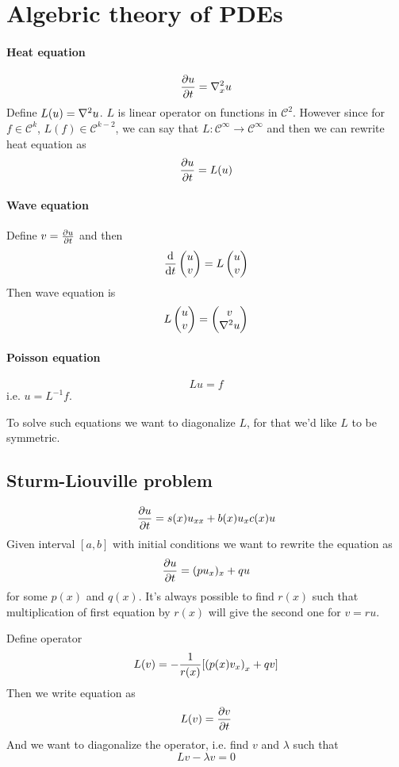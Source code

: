 \section{Algebric theory of PDEs}
\paragraph{Heat equation}
$$\pdv{u}{t} = \laplacian_x u$$
Define $L(u) = \laplacian u$. $L$ is linear operator on functions in $\mathcal{C}^2$. However since for $f\in \mathcal{C}^k$, $L(f) \in \mathcal{C}^{k-2}$, we can say that $L: \mathcal{C}^\infty \to \mathcal{C}^\infty$ and then we can rewrite heat equation as
$$\pdv{u}{t}  =L(u)$$

\paragraph{Wave equation}
Define $v=\pdv{u}{t}$ and then
$$\dv{t} \begin{pmatrix}u\\v\end{pmatrix} = L \begin{pmatrix}u\\v\end{pmatrix}$$
Then wave equation is
$$ L \begin{pmatrix}u\\v\end{pmatrix}=  \begin{pmatrix}v\\\laplacian{u}\end{pmatrix} $$

\paragraph{Poisson equation}
$$Lu = f$$
i.e.
$u=L^{-1}f$.

To solve such equations we want to diagonalize $L$, for that we'd like $L$ to be symmetric.
\subsection{Sturm-Liouville problem }
$$\pdv{u}{t} = s(x) u_{xx} + b(x) u_x c(x) u$$
Given interval $[a,b]$ with initial conditions we want to rewrite the equation as
$$\pdv{u}{t} = (pu_x)_x + qu$$
for some $p(x)$ and $q(x)$. It's always possible to find  $r(x)$ such that multiplication of first equation by $r(x)$ will give the second one for $v=ru$. 

Define operator
$$L(v) = -\frac{1}{r(x)}[\qty(p(x) v_x)_x + qv]$$
Then we write equation as
$$L(v) = \pdv{v}{t}$$
And we want to diagonalize the operator, i.e. find $v$ and $\lambda$ such that
$$Lv - \lambda v = 0$$

